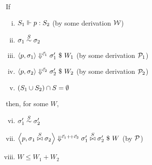 \begin{lem}  \label{lem-sgm-join}
	If 
	\begin{enumerate}[(i)]
		\item $\wf{p}{\S_1}{\S_2}$ (by some derivation $\MW$)
		\item $\sgm_1 \~{\S} \sgm_2$
		\item $\seval{p}{\sgm_1}{\c_1}{\sgm_1'}{W_1}$ (by some derivation $\MP_1$)
		\item $	\seval{p}{\sgm_2} {\c_2} {\sgm_2'}{W_2}$ (by some derivation $\MP_2$)
		\item $(\S_1 \cup \S_2) \cap \S = \emptyset $
	\end{enumerate}
	then, for some $W$, 
	\begin{enumerate}[(i)]
		\setcounter{enumi}{5}
		\item $\sgm_1' \~\S \sgm_2'$
		\item $\seval{p}{\sgm_1 \x\S \sgm_2}{\c_1 {\++} \c_2}{ \sgm_1' \x\S \sgm_2' }{W}$ (by $\MP$)
		\item $W \le W_1 + W_2$
	\end{enumerate}
\end{lem}



